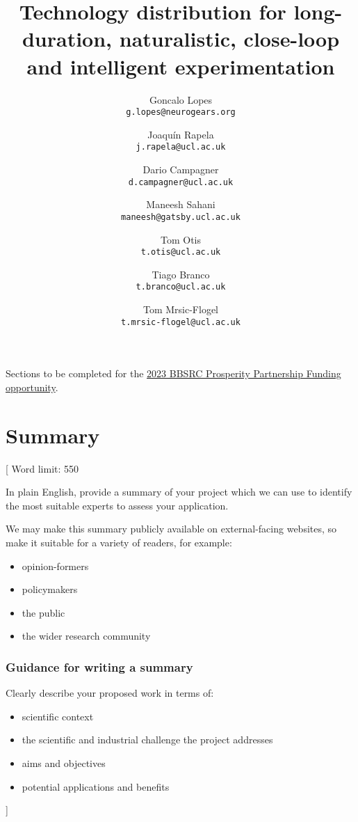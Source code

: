 \documentclass{article}
\title{Technology distribution for long-duration, naturalistic, close-loop
and intelligent experimentation}
\author{
    Goncalo Lopes\\
    \texttt{g.lopes@neurogears.org}\and
    Joaqu\'{i}n Rapela\\
    \texttt{j.rapela@ucl.ac.uk}\and
    Dario Campagner\\
    \texttt{d.campagner@ucl.ac.uk}\and
    Maneesh Sahani\\
    \texttt{maneesh@gatsby.ucl.ac.uk}\and
    Tom Otis\\
    \texttt{t.otis@ucl.ac.uk}\and
    Tiago Branco\\
    \texttt{t.branco@ucl.ac.uk}\and
    Tom Mrsic-Flogel\\
    \texttt{t.mrsic-flogel@ucl.ac.uk}
}
\newcommand{\desc}[1]{{\leavevmode\color{blue}[#1]}}
\begin{document}
\maketitle

Sections to be completed for the \href{https://www.ukri.org/opportunity/business-and-academia-prosperity-partnership-round-2/}{2023 BBSRC Prosperity Partnership Funding
opportunity}.

\section{Summary}
\desc{
Word limit: 550

In plain English, provide a summary of your project which we can use to
identify the most suitable experts to assess your application.

We may make this summary publicly available on external-facing websites, so
make it suitable for a variety of readers, for example:

\begin{itemize}
    \item opinion-formers

    \item policymakers

    \item the public

    \item the wider research community
\end{itemize}

\subsubsection*{Guidance for writing a summary}

Clearly describe your proposed work in terms of:

\begin{itemize}
    \item scientific context

    \item the scientific and industrial challenge the project addresses

    \item aims and objectives

    \item potential applications and benefits
\end{itemize}
}


\end{document}
